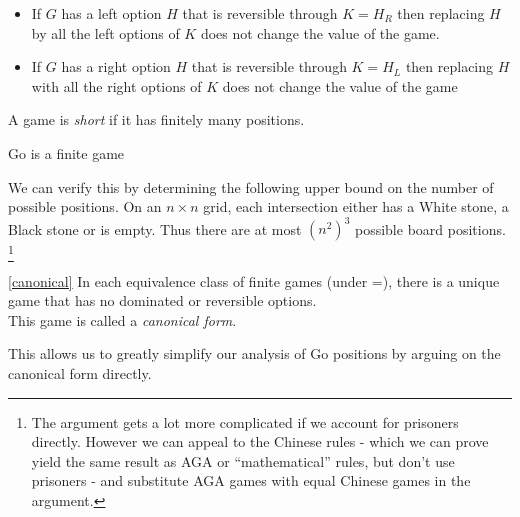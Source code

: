 \documentclass[../math194_paper.tex]{subfiles}
\begin{document}
\begin{theorem} \label{bypassing}\:
    \begin{itemize} 
        \item If $G$ has a left option $H$ that is reversible through $K=H_R$ then 
        replacing $H$ by all the left options of $K$ does not change the value of the game.
        \item If $G$ has a right option $H$ that is reversible through $K=H_L$ then 
        replacing $H$ with all the right options of $K$ does not change the value of the 
        game
    \end{itemize}
\end{theorem}

\begin{definition}
    A game is \textit{short} if it has finitely many positions.
\end{definition}

\begin{lemma}
    Go is a finite game
\end{lemma}
We can verify this by determining the following 
upper bound on the number of possible positions. On an $n \times n$ grid, each intersection
either has a White stone, a Black stone or is empty. Thus there are at most $(n^2)^3$
possible board positions. \footnote{
    The argument gets a lot more complicated if we account for prisoners directly. However 
    we can appeal to the Chinese rules - which we can prove yield the same result as 
    AGA or ``mathematical'' rules, but don't use prisoners - and substitute AGA games 
    with equal Chinese games in the argument.
}

\begin{definition}
    \ref{canonical}
    In each equivalence class of finite games (under =), there is a unique game that has no dominated
    or reversible options. \\
    This game is called a \textit{canonical form}.
\end{definition}
This allows us to greatly simplify our analysis of Go positions by arguing on the canonical 
form directly. 
\end{document}
